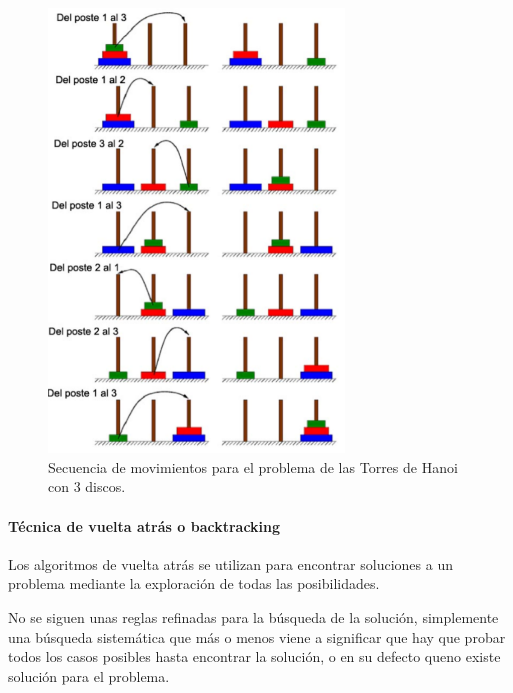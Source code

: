 \documentclass[a4paper, 11pt, titlepage]{article}
\begin{document}
                    \begin{figure}[htp]
                        \centering
                        \includegraphics[width=0.7\textwidth]{resources/recursividad05.png}
                        \caption{Secuencia de movimientos para el problema de las Torres de Hanoi con 
                        3 discos.}
                        \label{hanoi03}
                    \end{figure}

            \paragraph{Técnica de vuelta atrás o backtracking}

                Los algoritmos de vuelta atrás se utilizan para encontrar soluciones a un problema 
                mediante la exploración de todas las posibilidades.

                No se siguen unas reglas refinadas para la búsqueda de la solución, simplemente una 
                búsqueda sistemática que más o menos viene a significar que hay que probar todos los 
                casos posibles hasta encontrar la solución, o en su defecto queno existe solución para 
                el problema.
\end{document}
